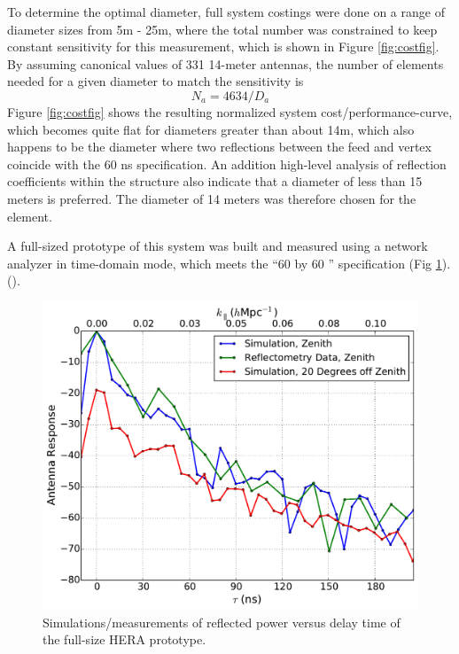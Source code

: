 \documentclass{article}
\begin{document}
To determine the optimal diameter, full system costings were done on a range of diameter sizes from 5m - 25m, where the total number was constrained to keep constant sensitivity for this measurement, which is shown in Figure \ref{fig:costfig}.  By assuming canonical values of 331 14-meter antennas, the number of elements needed for a given diameter to match the sensitivity is
\begin{equation}
N_a = 4634/D_a
\end{equation}
Figure \ref{fig:costfig} shows the resulting normalized system cost/performance-curve, which becomes quite flat for diameters greater than about 14m, which also happens to be the diameter where two reflections between the feed and vertex coincide with the 60 ns specification.  An addition high-level analysis of reflection coefficients within the structure also indicate that a diameter of less than 15 meters is preferred.  The diameter of 14 meters was therefore chosen for the element.

A full-sized prototype of this system was built and measured using a network analyzer in time-domain mode, which meets the ``60 by 60 '' specification (Fig \ref{fig:refl}). (\cite{heraMemo5}).

\begin{figure}[t]
\centerline{
\includegraphics[width=\textwidth]{plots/compareSimToDataNormalized.pdf} 
}
\caption{\small Simulations/measurements of reflected power versus delay time of the full-size HERA prototype.
\label{fig:refl}}
\end{figure}
\end{document}
